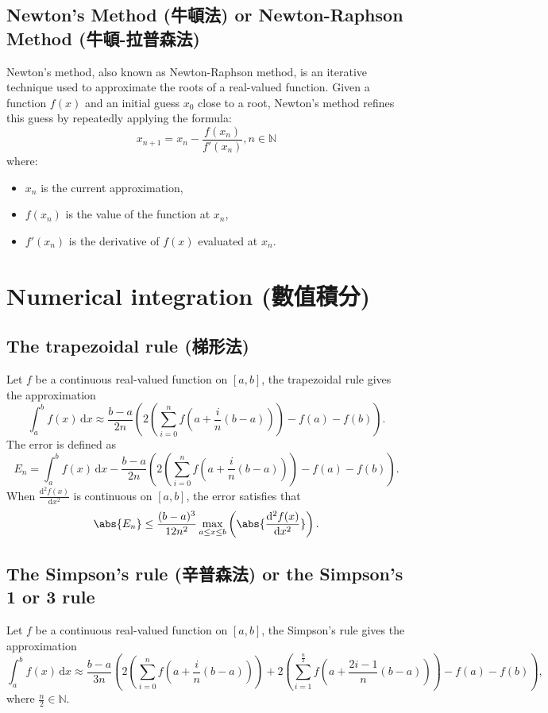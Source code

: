 \documentclass[a4paper,12pt]{report}
\begin{document}
{{{{{{{{{{{{{{{{{\subsection{Newton's Method (牛頓法) or Newton-Raphson Method (牛頓-拉普森法)}
Newton's method, also known as Newton-Raphson method, is an iterative technique used to approximate the roots of a real-valued function. Given a function $f(x)$ and an initial guess \( x_0 \) close to a root, Newton's method refines this guess by repeatedly applying the formula:
\[
x_{n+1} = x_n - \frac{f(x_n)}{f'(x_n)},n\in\mathbb{N}
\]
where:
\begin{itemize}
\item \( x_n \) is the current approximation,
\item \( f(x_n) \) is the value of the function at \( x_n \),
\item \( f'(x_n) \) is the derivative of \( f(x) \) evaluated at \( x_n \).
\end{itemize}



\section{Numerical integration (數值積分)}
\subsection{The trapezoidal rule (梯形法)}
Let $f$ be a continuous real-valued function on $[a,b]$, the trapezoidal rule gives the approximation
\[\int_a^bf(x)\,\mathrm{d}x\approx\frac{b-a}{2n}\left(2\left(\sum_{i=0}^nf(a+\frac{i}{n}(b-a))\right)-f(a)-f(b)\right).\]
The error is defined as
\[E_n=\int_a^bf(x)\,\mathrm{d}x-\frac{b-a}{2n}\left(2\left(\sum_{i=0}^nf(a+\frac{i}{n}(b-a))\right)-f(a)-f(b)\right).\]
When $\frac{\mathrm{d}^2f(x)}{\mathrm{d}x^2}$ is continuous on $[a,b]$, the error satisfies that
\[\abs{E_n}\leq\frac{(b-a)^3}{12n^2}\max_{a\leq x\leq b}\left(\abs{\frac{\mathrm{d}^2f(x)}{\mathrm{d}x^2}}\right).\]
\subsection{The Simpson's rule (辛普森法) or the Simpson's 1 or 3 rule}
Let $f$ be a continuous real-valued function on $[a,b]$, the Simpson's rule gives the approximation
\[\int_a^bf(x)\,\mathrm{d}x\approx\frac{b-a}{3n}\left(2\left(\sum_{i=0}^nf(a+\frac{i}{n}(b-a))\right)+2\left(\sum_{i=1}^{\frac{n}{2}}f(a+\frac{2i-1}{n}(b-a))\right)-f(a)-f(b)\right),\]
where $\frac{n}{2}\in\mathbb{N}$.

}}}}}}}}}}}}}}}}}
\end{document}
